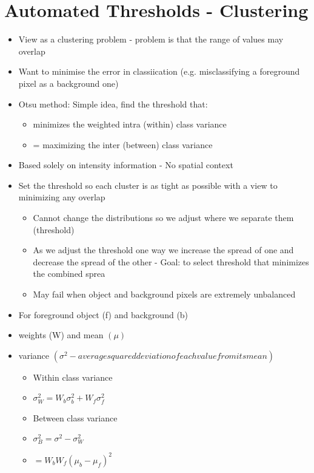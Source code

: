 \documentclass[a4paper]{article}
\begin{document}
	\section{Automated Thresholds - Clustering}
	\begin{itemize}
		\item View as a clustering problem - problem is that the range of values may overlap
		\item Want to minimise the error in classiication (e.g. misclassifying a foreground pixel as a background one)
		\item Otsu method: Simple idea, find the threshold that:
		\begin{itemize}
			\item minimizes the weighted intra (within) class variance
			\item = maximizing the inter (between) class variance
		\end{itemize}
		\item Based solely on intensity information - No spatial context
		\item Set the threshold so each cluster is as tight as possible with a view to minimizing any overlap
		\begin{itemize}
			\item Cannot change the distributions so we adjust where we separate them (threshold)
			\item As we adjust the threshold one way we increase the spread of one and decrease the spread of the other - Goal: to select threshold that minimizes the combined sprea
			\item May fail when object and background pixels are extremely unbalanced
		\end{itemize}
		\item For foreground object (f) and background (b)
		\item weights (W) and mean $(\mu)$
		\item variance $(\sigma^2 - average squared deviation of each value from its mean)$
		\begin{itemize}
			\item Within class variance
			\item $\sigma_W^2 = W_b\sigma_b^2 + W_f\sigma_f^2$
			\item Between class variance
			\item $\sigma_B^2 = \sigma^2 - \sigma_W^2$
			\item  $= W_bW_f(\mu_b - \mu_f)^2$
		\end{itemize}
	\end{itemize}
\end{document}
